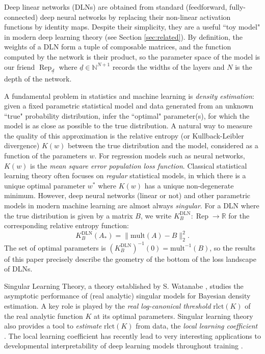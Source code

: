 \documentclass[a4paper]{amsart}
\DeclareMathOperator{\Rep}{\mathrm{Rep}}
\newcommand{\R}{\mathbb{R}}
\newcommand{\N}{\mathbb{N}}
\newcommand{\ud}{\underline{d}}
\newcommand{\rlct}{\mathrm{rlct}}
\newcommand{\DLN}{\mathrm{DLN}}
\newcommand{\mult}{\mathrm{mult}}
\theoremstyle{plain}
\begin{document}
Deep linear networks (DLNs) are obtained from standard (feedforward, fully-connected) deep neural networks by replacing their non-linear activation functions by identity maps. Despite their simplicity, they are a useful ``toy model" in modern deep learning theory (see Section \ref{sec:related}). By definition, the weights of a DLN form a tuple of composable matrices, and the function computed by the network is their product, so the parameter space of the model is our friend $\Rep_{\ud}$ where $\ud\in \N^{N+1}$ records the widths of the layers and $N$ is the depth of the network. 

A fundamental problem in statistics and machine learning is \emph{density estimation}: given a fixed parametric statistical model and data generated from an unknown ``true" probability distribution, infer the ``optimal" parameter(s), for which the model is as close as possible to the true distribution. A natural way to measure the quality of this approximation is the relative entropy (or Kullback-Leibler divergence) $K(w)$ between the true distribution and the model, considered as a function of the parameters $w$. For regression models such as neural networks, $K(w)$ is the \emph{mean square error population loss function}. Classical statistical learning theory often focuses on \emph{regular} statistical models, in which there is a unique optimal parameter $w^*$ where $K(w)$ has a unique non-degenerate minimum. However, deep neural networks (linear or not) and other parametric models in modern machine learning are almost always \emph{singular}. For a DLN where the true distribution is given by a matrix $B$, we write $K^{\DLN}_B:\Rep\to \R$ for the corresponding relative entropy function:
\[
K^{\DLN}_B(A_*)=\| \mult(A)-B \|^2_2.
\]
The set of optimal parameters is $(K^{\DLN}_B)^{-1}(0)=\mult^{-1}(B)$, so the results of this paper precisely describe the geometry of the bottom of the loss landscape of DLNs.

Singular Learning Theory, a theory established by S. Watanabe \cite{watanabe2009,watanabe2018,watanabe2024recent}, studies the asymptotic performance of (real analytic) singular models for Bayesian density estimation. A key role is played by the \emph{real log-canonical threshold} $\rlct(K)$ of the real analytic function $K$ at its optimal parameters. Singular learning theory also provides a tool to \emph{estimate} $\rlct(K)$ from data, the \emph{local learning coefficient} \cite{lau2024locallearningcoefficientsingularityaware}. The local learning coefficient has recently lead to very interesting applications to developmental interpretability of deep learning models throughout training \cite{chen2023dynamicalversusbayesianphase,hoogland2024developmentallandscapeincontextlearning,wang2024differentiationspecializationattentionheads}.
\end{document}
